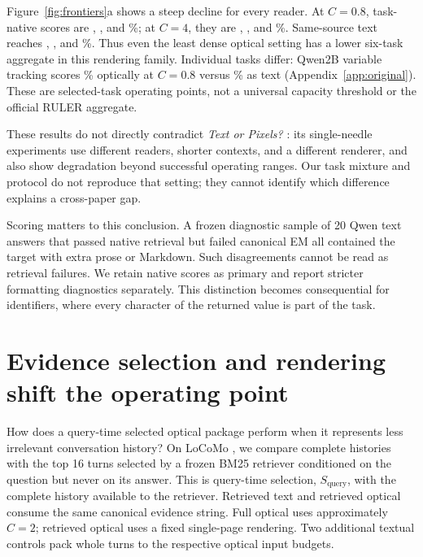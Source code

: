 \documentclass{article}
\begin{document}
Figure~\ref{fig:frontiers}a shows a steep decline for every reader. At $C=0.8$, task-native scores are , , and \%; at $C=4$, they are , , and \%. Same-source text reaches , , and \%. Thus even the least dense optical setting has a lower six-task aggregate in this rendering family. Individual tasks differ: Qwen2B variable tracking scores \% optically at $C=0.8$ versus \% as text (Appendix~\ref{app:original}). These are selected-task operating points, not a universal capacity threshold or the official RULER aggregate.

\begin{table}[t]
\centering\small
\caption{\textbf{Realized RULER visual density.} Median per-case $C_{\mathrm{eff}}=N_M(X)/V$ at each nominal target. Both Qwen readers have the same recorded counts. Appendix~\ref{app:original} gives native counts and ranges.}
\label{tab:rates}
\end{table}

These results do not directly contradict \emph{Text or Pixels?} \citep{textpixels}: its single-needle experiments use different readers, shorter contexts, and a different renderer, and also show degradation beyond successful operating ranges. Our task mixture and protocol do not reproduce that setting; they cannot identify which difference explains a cross-paper gap.

Scoring matters to this conclusion. A frozen diagnostic sample of 20 Qwen text answers that passed native retrieval but failed canonical EM all contained the target with extra prose or Markdown. Such disagreements cannot be read as retrieval failures. We retain native scores as primary and report stricter formatting diagnostics separately. This distinction becomes consequential for identifiers, where every character of the returned value is part of the task.

\section{Evidence selection and rendering shift the operating point}
\label{sec:selection}
How does a query-time selected optical package perform when it represents less irrelevant conversation history? On LoCoMo \citep{locomo}, we compare complete histories with the top 16 turns selected by a frozen BM25 retriever conditioned on the question but never on its answer. This is query-time selection, $S_{\mathrm{query}}$, with the complete history available to the retriever. Retrieved text and retrieved optical consume the same canonical evidence string. Full optical uses approximately $C=2$; retrieved optical uses a fixed single-page rendering. Two additional textual controls pack whole turns to the respective optical input budgets.
\end{document}
